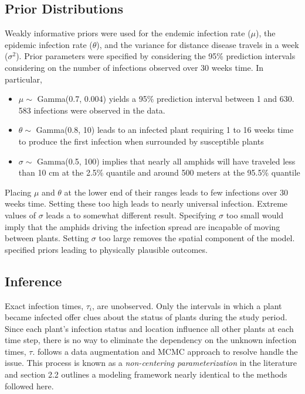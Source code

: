 \documentclass{uwstat572}
\begin{document}
\subsection{Prior Distributions}
Weakly informative priors were used for the endemic infection rate ($\mu$), the epidemic infection rate ($\theta$), and the variance for distance disease travels in a week ($\sigma^2$). 
Prior parameters were specified by considering the 95\% prediction intervals considering on the number of infections observed over 30 weeks time.
In particular,  
\begin{itemize}
\item $\mu \sim$ Gamma(0.7, 0.004) yields a 95\% prediction interval between 1 and 630. 583 infections were observed in the data.
\item $\theta \sim$ Gamma(0.8, 10) leads to an infected plant requiring 1 to 16 weeks time to produce the first infection when surrounded by susceptible plants
\item $\sigma \sim$ Gamma(0.5, 100) implies that nearly all amphids will have traveled less than 10 cm at the 2.5\% quantile and around 500 meters at the 95.5\% quantile
\end{itemize}
Placing $\mu$ and $\theta$ at the lower end of their ranges leads to few infections over 30 weeks time. 
Setting these too high leads to nearly universal infection. 
Extreme values of $\sigma$ leads a to somewhat different result. 
Specifying $\sigma$ too small would imply that the amphids driving the infection spread are incapable of moving between plants. 
Setting $\sigma$ too large removes the spatial component of the model. 
\cite{Brown} specified priors leading to physically plausible outcomes. 


\subsection{Inference}
Exact infection times, $\tau_i$, are unobserved. 
Only the intervals in which a plant became infected offer clues about the status of plants during the study period. 
Since each plant's infection status and location influence all other plants at each time step, there is no way to eliminate the dependency on the unknown infection times, $\tau$.
\cite{Brown} follows a data augmentation and MCMC approach to resolve handle the issue. 
This process is known as a \textit{non-centering parameterization} in the literature and \cite{Jewell} section 2.2 outlines a modeling framework nearly identical to the methods followed here. 
\end{document}
